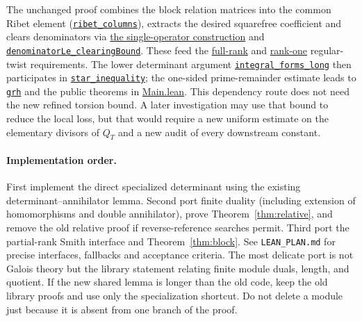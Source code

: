 \documentclass[11pt]{article}
\newcommand{\src}[3]{\href{https://github.com/VladimirReshetnikov/ProveIt/blob/835c3695d07c0f77060c5cc63f92eeb52a7d21c2/Analysis/GeneralizedRiemannHypothesis/Lean/grh/src/#1.lean\#L#2}{#3}}
\begin{document}
The unchanged proof combines the block relation matrices into the common Ribet element (\src{New/Congruences/FirstOrder/RibetElement}{289}{\texttt{ribet\_columns}}), extracts the desired squarefree coefficient and clears denominators via \src{New/Congruences/FirstOrder/DenominatorBound}{1156}{the single-operator construction} and \src{New/Congruences/FirstOrder/DenominatorBound}{1321}{\texttt{denominatorLe\_clearingBound}}. These feed the \src{New/Congruences/FitTwistsExist}{429}{full-rank} and \src{New/Congruences/FitTwistsExist}{458}{rank-one} regular-twist requirements. The lower determinant argument \src{New/Determinant/Twist/LongForms}{214}{\texttt{integral\_forms\_long}} then participates in \src{New/Reduction/MainInequality}{87}{\texttt{star\_inequality}}; the one-sided prime-remainder estimate leads to \src{New/Reduction/OneSidedBound}{239}{\texttt{grh}} and the public theorems in \src{Main}{5}{Main.lean}. This dependency route does not need the new refined torsion bound. A later investigation may use that bound to reduce the local loss, but that would require a new uniform estimate on the elementary divisors of $Q_T$ and a new audit of every downstream constant.

\paragraph{Implementation order.} First implement the direct specialized determinant using the existing determinant--annihilator lemma. Second port finite duality (including extension of homomorphisms and double annihilator), prove Theorem~\ref{thm:relative}, and remove the old relative proof if reverse-reference searches permit. Third port the partial-rank Smith interface and Theorem~\ref{thm:block}. See \texttt{LEAN\_PLAN.md} for precise interfaces, fallbacks and acceptance criteria. The most delicate port is not Galois theory but the library statement relating finite module duals, length, and quotient. If the new shared lemma is longer than the old code, keep the old library proofs and use only the specialization shortcut. Do not delete a module just because it is absent from one branch of the proof.
\end{document}
